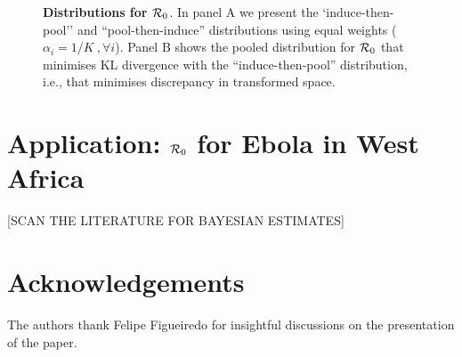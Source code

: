 \documentclass[11pt]{article}
\begin{document}
\begin{figure}
\begin{center}
\end{center}
\caption{
\textbf{Distributions for ${\cal R}_0$}.
In panel A we present the `induce-then-pool'' and ``pool-then-induce'' distributions using equal weights ($\alpha_i = 1/K \:, \forall i$).
Panel B shows the pooled distribution for ${\cal R}_0$ that minimises KL divergence with the ``induce-then-pool'' distribution, i.e., that minimises discrepancy in transformed space.
}
\label{fig:transformAndKL}
\end{figure}


\section{Application: ${\cal R}_0$ for Ebola in West Africa}
[SCAN THE LITERATURE FOR BAYESIAN ESTIMATES]
\section*{Acknowledgements}
The authors thank Felipe Figueiredo for insightful discussions on the presentation of the paper.

\end{document}
